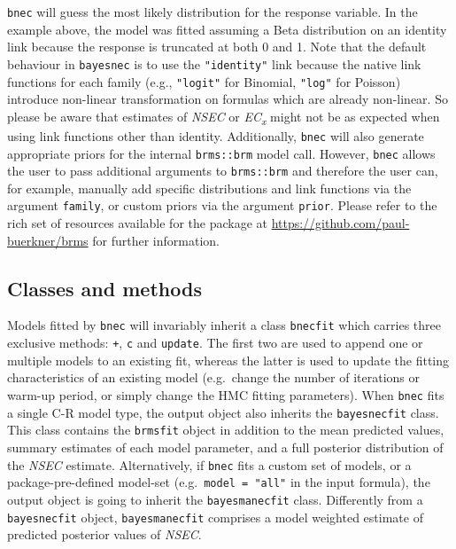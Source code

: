 \documentclass[
  shortnames]{jss}
\begin{document}
\texttt{bnec} will guess the most likely distribution for the response variable. In the example above, the model was fitted assuming a Beta distribution on an identity link because the response is truncated at both 0 and 1. Note that the default behaviour in \texttt{bayesnec} is to use the \texttt{"identity"} link because the native link functions for each family (e.g., \texttt{"logit"} for Binomial, \texttt{"log"} for Poisson) introduce non-linear transformation on formulas which are already non-linear. So please be aware that estimates of \emph{NSEC} or \emph{EC\textsubscript{x}} might not be as expected when using link functions other than identity. Additionally, \texttt{bnec} will also generate appropriate priors for the internal \texttt{brms::brm} model call. However, \texttt{bnec} allows the user to pass additional arguments to \texttt{brms::brm} and therefore the user can, for example, manually add specific distributions and link functions via the argument \texttt{family}, or custom priors via the argument \texttt{prior}. Please refer to the rich set of resources available for the  package at \url{https://github.com/paul-buerkner/brms} for further information.

\hypertarget{classes-and-methods}{%
\subsection{Classes and methods}\label{classes-and-methods}}

Models fitted by \texttt{bnec} will invariably inherit a class \texttt{bnecfit} which carries three exclusive methods: \texttt{+}, \texttt{c} and \texttt{update}. The first two are used to append one or multiple models to an existing fit, whereas the latter is used to update the fitting characteristics of an existing model (e.g.~change the number of iterations or warm-up period, or simply change the HMC fitting parameters). When \texttt{bnec} fits a single C-R model type, the output object also inherits the \texttt{bayesnecfit} class. This class contains the \texttt{brmsfit} object in addition to the mean predicted values, summary estimates of each model parameter, and a full posterior distribution of the \emph{NSEC} estimate. Alternatively, if \texttt{bnec} fits a custom set of models, or a package-pre-defined model-set (e.g.~\texttt{model\ =\ "all"} in the input formula), the output object is going to inherit the \texttt{bayesmanecfit} class. Differently from a \texttt{bayesnecfit} object, \texttt{bayesmanecfit} comprises a model weighted estimate of predicted posterior values of \emph{NSEC}.
\end{document}
